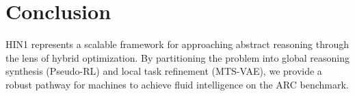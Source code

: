 \documentclass[11pt,a4paper]{article}
\begin{document}
\section{Conclusion}
HIN1 represents a scalable framework for approaching abstract reasoning through the lens of hybrid optimization. By partitioning the problem into global reasoning synthesis (Pseudo-RL) and local task refinement (MTS-VAE), we provide a robust pathway for machines to achieve fluid intelligence on the ARC benchmark.



\end{document}
